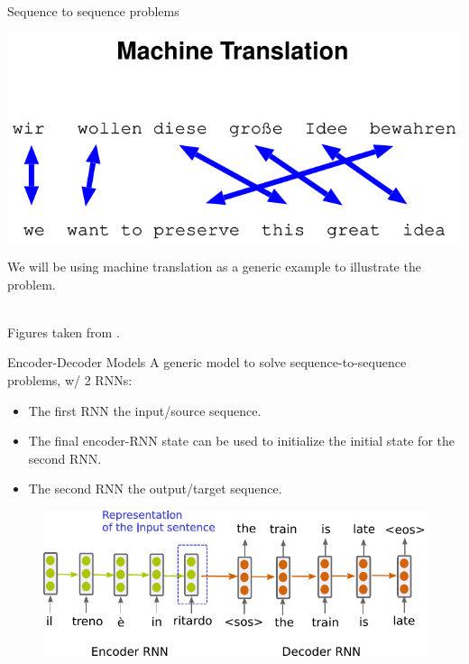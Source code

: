 \begin{frame}{Sequence to sequence problems}
\begin{minipage}{0.45\linewidth}
   \begin{center}
     \includegraphics[width=0.9\linewidth]{figures/trans_illu.png}
   \end{center}
 \end{minipage}
\begin{minipage}{0.45\linewidth}
We will be using machine translation as a generic example to illustrate the problem.
 \end{minipage}\\
\vsp
\scriptsize{Figures taken from \cite{neylecture2019}.}
\end{frame}

\begin{frame}{Encoder-Decoder Models}
A generic model to solve sequence-to-sequence problems, w/ 2 RNNs:
\begin{itemize}
\item The first RNN  the input/source sequence.
\item The final encoder-RNN state can be used to initialize the
initial state for the second RNN.
\item The second RNN  the output/target sequence.
\end{itemize}
\begin{figure}
  \begin{center}
    \includegraphics[height=0.5\textheight]{figures/enc-dec.pdf}
  \end{center}
\end{figure}
\end{frame}

